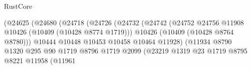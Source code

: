 \begin{lexlean}{RustCore}
\begin{coremodule}
                                                      (@24625
                                                        (@24680
                                                          (@24718
                                                            (@24726
                                                              (@24732
                                                                (@24742
                                                                  (@24752
                                                                    @24756
                                                                    @11908
                                                                    @10426
                                                                    (@10409 (@10428 @8774 @1719)))
                                                                  @10426
                                                                  (@10409 (@10428 @8764 @8780)))
                                                                @10444
                                                                @10448
                                                                @10453
                                                                @10458
                                                                @10464
                                                                @11928)
                                                              (@11934
                                                                @8790
                                                                @1320
                                                                @295
                                                                @90
                                                                @1719
                                                                @8796
                                                                @1719
                                                                @2099
                                                                (@23219
                                                                  @1319
                                                                  @23
                                                                  @1719
                                                                  @8795
                                                                  @8221
                                                                  @11958
                                                                  (@11961

\end{coremodule}
\end{lexlean}

